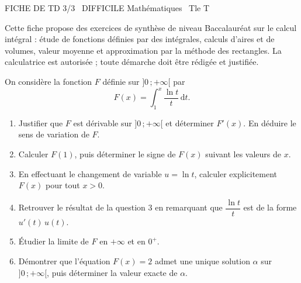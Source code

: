 \documentclass[11pt]{article}
\begin{document}
\begin{tcolorbox}[enhanced,colback=popink,colframe=popink,arc=10pt,boxrule=0pt,left=12pt,right=12pt,top=9pt,bottom=9pt]
{\color{white}\popxbold\small FICHE DE TD 3/3 \textbullet\ DIFFICILE \hfill Mathématiques \textbullet\ Tle T\par}
\end{tcolorbox}
\vspace{4pt}
Cette fiche propose des exercices de synthèse de niveau Baccalauréat sur le calcul intégral : étude de fonctions définies par des intégrales, calculs d'aires et de volumes, valeur moyenne et approximation par la méthode des rectangles. La calculatrice est autorisée ; toute démarche doit être rédigée et justifiée.

\begin{exercice}
On considère la fonction $F$ définie sur $]0\,;+\infty[$ par
\[F(x)=\int_{1}^{x}\dfrac{\ln t}{t}\,\mathrm{d}t.\]
\begin{enumerate}
\item Justifier que $F$ est dérivable sur $]0\,;+\infty[$ et déterminer $F'(x)$. En déduire le sens de variation de $F$.
\item Calculer $F(1)$, puis déterminer le signe de $F(x)$ suivant les valeurs de $x$.
\item En effectuant le changement de variable $u=\ln t$, calculer explicitement $F(x)$ pour tout $x>0$.
\item Retrouver le résultat de la question 3 en remarquant que $\dfrac{\ln t}{t}$ est de la forme $u'(t)\,u(t)$.
\item Étudier la limite de $F$ en $+\infty$ et en $0^+$.
\item Démontrer que l'équation $F(x)=2$ admet une unique solution $\alpha$ sur $]0\,;+\infty[$, puis déterminer la valeur exacte de $\alpha$.
\end{enumerate}
\end{exercice}
\end{document}
